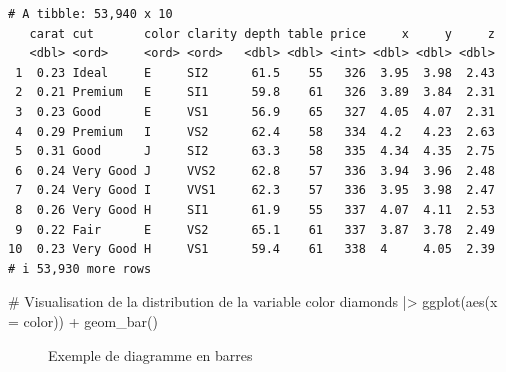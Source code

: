\documentclass[
  letterpaper,
]{book}
\newenvironment{Shaded}{\begin{snugshade}}{\end{snugshade}}
\newcommand{\AttributeTok}[1]{\textcolor[rgb]{0.40,0.45,0.13}{#1}}
\newcommand{\CommentTok}[1]{\textcolor[rgb]{0.37,0.37,0.37}{#1}}
\newcommand{\FunctionTok}[1]{\textcolor[rgb]{0.28,0.35,0.67}{#1}}
\newcommand{\NormalTok}[1]{\textcolor[rgb]{0.00,0.23,0.31}{#1}}
\newcommand{\SpecialCharTok}[1]{\textcolor[rgb]{0.37,0.37,0.37}{#1}}
\begin{document}
\begin{verbatim}
# A tibble: 53,940 x 10
   carat cut       color clarity depth table price     x     y     z
   <dbl> <ord>     <ord> <ord>   <dbl> <dbl> <int> <dbl> <dbl> <dbl>
 1  0.23 Ideal     E     SI2      61.5    55   326  3.95  3.98  2.43
 2  0.21 Premium   E     SI1      59.8    61   326  3.89  3.84  2.31
 3  0.23 Good      E     VS1      56.9    65   327  4.05  4.07  2.31
 4  0.29 Premium   I     VS2      62.4    58   334  4.2   4.23  2.63
 5  0.31 Good      J     SI2      63.3    58   335  4.34  4.35  2.75
 6  0.24 Very Good J     VVS2     62.8    57   336  3.94  3.96  2.48
 7  0.24 Very Good I     VVS1     62.3    57   336  3.95  3.98  2.47
 8  0.26 Very Good H     SI1      61.9    55   337  4.07  4.11  2.53
 9  0.22 Fair      E     VS2      65.1    61   337  3.87  3.78  2.49
10  0.23 Very Good H     VS1      59.4    61   338  4     4.05  2.39
# i 53,930 more rows
\end{verbatim}

\begin{Shaded}
\begin{Highlighting}[]
\CommentTok{\# Visualisation de la distribution de la variable color}
\NormalTok{diamonds }\SpecialCharTok{|\textgreater{}} 
  \FunctionTok{ggplot}\NormalTok{(}\FunctionTok{aes}\NormalTok{(}\AttributeTok{x =}\NormalTok{ color)) }\SpecialCharTok{+} 
    \FunctionTok{geom\_bar}\NormalTok{()}
\end{Highlighting}
\end{Shaded}

\begin{figure}[H]


\caption{\label{fig-geombar}Exemple de diagramme en barres}

\end{figure}%
\end{document}
